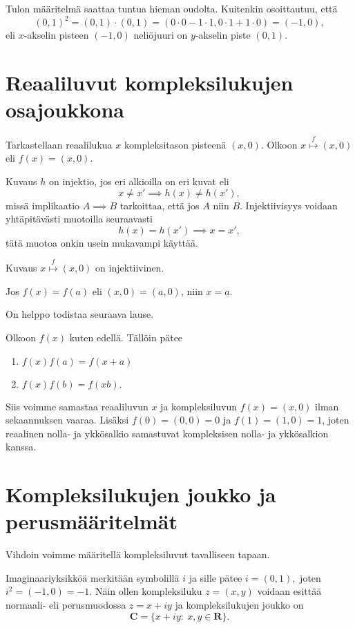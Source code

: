 \documentclass[a4paper, 12pt]{article}
\theoremstyle{remark}
\theoremstyle{definition}
\newenvironment{listab} %
    {\begin{enumerate}[leftmargin=*, label=\roman*), topsep=0pt, itemsep=0pt, parsep=0pt, font=\small\bfseries\color{blue}] \itemsep0pt \parskip0pt \parsep0pt \topsep0pt}
    {\end{enumerate}}
\begin{document}
Tulon määritelmä saattaa tuntua hieman oudolta. Kuitenkin osoittautuu, että
$$
(0,1)^2=(0,1)\cdot(0,1)=(0\cdot 0 -1\cdot 1, 0\cdot 1+1\cdot 0)=(-1, 0),
$$
eli $x$-akselin pisteen $(-1, 0)$ neliöjuuri on $y$-akselin piste $(0,1).$
\clearpage
\section{Reaaliluvut kompleksilukujen osajoukkona}
Tarkastellaan reaalilukua $x$ kompleksitason pisteenä $(x, 0).$ Olkoon
$x\overset{f}{\mapsto} (x, 0)$ eli $f(x)=(x, 0)$.
\begin{maar}
Kuvaus $h$ on injektio, jos eri alkioilla on eri kuvat eli
$$
x\neq x'\implies h(x)\neq h(x'),
$$
missä implikaatio $A\implies B$ tarkoittaa, että jos $A$  niin $B.$ Injektiivisyys voidaan yhtäpitävästi muotoilla seuraavasti
$$
h(x)=h(x')\implies x=x',
$$
tätä muotoa onkin usein mukavampi käyttää.
\end{maar}
\begin{lause}
Kuvaus $x\overset{f}{\mapsto} (x, 0)$ on injektiivinen.
\end{lause}
\begin{tod}
Jos $f(x)=f(a)$ eli $(x, 0)=(a, 0)$, niin $x=a.$
\end{tod}

On helppo todistaa seuraava lause.
\begin{lause} Olkoon $f(x)$ kuten edellä. Tällöin pätee
\begin{listab}
\item $f(x)f(a)=f(x+a)$
\item $f(x)f(b)=f(xb).$
\end{listab}

Siis voimme samastaa reaaliluvun $x$ ja kompleksiluvun $f(x)=(x, 0)$ ilman sekaannuksen vaaraa. Lisäksi $f(0)=(0, 0)=0$ ja $f(1)=(1, 0)=1$, joten reaalinen nolla- ja ykkösalkio samastuvat kompleksisen nolla- ja ykkösalkion kanssa.
\end{lause}
\clearpage

\section{Kompleksilukujen joukko ja perusmääritelmät}
Vihdoin voimme määritellä kompleksiluvut tavalliseen tapaan.
\begin{maar}
Imaginaariyksikköä merkitään symbolillä $i$ ja sille pätee $i=(0,1),$ joten $i^2=(-1, 0)=-1.$ Näin ollen kompleksiluku $z=(x, y)$ voidaan esittää normaali- eli perusmuodossa
$z=x+iy
$
ja kompleksilukujen joukko on
$$
\mathbf{C}=\bigl\{x+iy:\ x, y\in \mathbf{R} \bigr\}.
$$
\end{maar}
\end{document}
